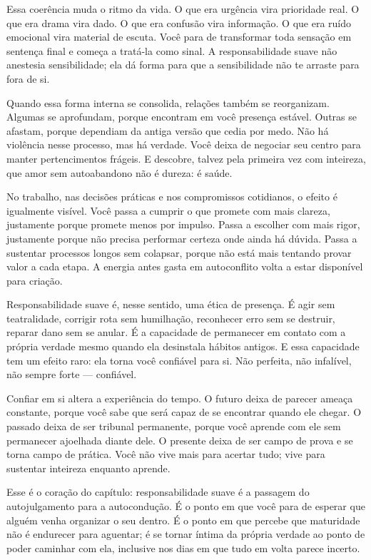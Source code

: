\documentclass[12pt]{book}
\begin{document}
Essa coerência muda o ritmo da vida. O que era urgência vira prioridade real. O que era drama vira dado. O que era confusão vira informação. O que era ruído emocional vira material de escuta. Você para de transformar toda sensação em sentença final e começa a tratá-la como sinal. A responsabilidade suave não anestesia sensibilidade; ela dá forma para que a sensibilidade não te arraste para fora de si.

Quando essa forma interna se consolida, relações também se reorganizam. Algumas se aprofundam, porque encontram em você presença estável. Outras se afastam, porque dependiam da antiga versão que cedia por medo. Não há violência nesse processo, mas há verdade. Você deixa de negociar seu centro para manter pertencimentos frágeis. E descobre, talvez pela primeira vez com inteireza, que amor sem autoabandono não é dureza: é saúde.

No trabalho, nas decisões práticas e nos compromissos cotidianos, o efeito é igualmente visível. Você passa a cumprir o que promete com mais clareza, justamente porque promete menos por impulso. Passa a escolher com mais rigor, justamente porque não precisa performar certeza onde ainda há dúvida. Passa a sustentar processos longos sem colapsar, porque não está mais tentando provar valor a cada etapa. A energia antes gasta em autoconflito volta a estar disponível para criação.

Responsabilidade suave é, nesse sentido, uma ética de presença. É agir sem teatralidade, corrigir rota sem humilhação, reconhecer erro sem se destruir, reparar dano sem se anular. É a capacidade de permanecer em contato com a própria verdade mesmo quando ela desinstala hábitos antigos. E essa capacidade tem um efeito raro: ela torna você confiável para si. Não perfeita, não infalível, não sempre forte --- confiável.

Confiar em si altera a experiência do tempo. O futuro deixa de parecer ameaça constante, porque você sabe que será capaz de se encontrar quando ele chegar. O passado deixa de ser tribunal permanente, porque você aprende com ele sem permanecer ajoelhada diante dele. O presente deixa de ser campo de prova e se torna campo de prática. Você não vive mais para acertar tudo; vive para sustentar inteireza enquanto aprende.

Esse é o coração do capítulo: responsabilidade suave é a passagem do autojulgamento para a autocondução. É o ponto em que você para de esperar que alguém venha organizar o seu dentro. É o ponto em que percebe que maturidade não é endurecer para aguentar; é se tornar íntima da própria verdade ao ponto de poder caminhar com ela, inclusive nos dias em que tudo em volta parece incerto.
\end{document}
